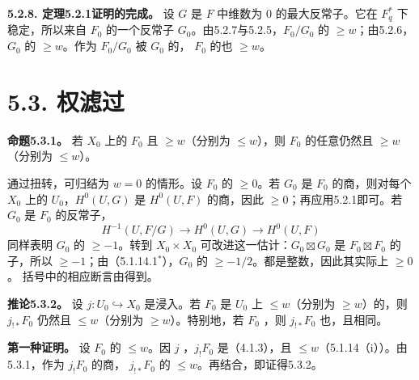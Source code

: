 \par\medskip\noindent\textbf{5.2.8. 定理5.2.1证明的完成。} 设 $G$ 是 $F$ 中维数为 $0$ 的最大反常子。它在 $F_q^*$ 下稳定，所以来自 $F_0$ 的一个反常子 $G_0$。由5.2.7与5.2.5，$F_0/G_0$ 的 $\ge w$；由5.2.6，$G_0$ 的 $\ge w$。作为 $F_0/G_0$ 被 $G_0$ 的， $F_0$ 的也 $\ge w$。

\section*{5.3. 权滤过}
\par\medskip\noindent\textbf{命题5.3.1。} 若 $X_0$ 上的 $F_0$ 且 $\ge w$（分别为 $\le w$），则 $F_0$ 的任意仍然且 $\ge w$（分别为 $\le w$）。

通过扭转，可归结为 $w=0$ 的情形。设 $F_0$ 的 $\ge0$。若 $G_0$ 是 $F_0$ 的商，则对每个 $X_0$ 上的 $U_0$，$H^0(U,G)$ 是 $H^0(U,F)$ 的商，因此 $\ge0$；再应用5.2.1即可。若 $G_0$ 是 $F_0$ 的反常子，
\[
H^{-1}(U,F/G)\longrightarrow H^0(U,G)\longrightarrow H^0(U,F)
\]
同样表明 $G_0$ 的 $\ge-1$。转到 $X_0\times X_0$ 可改进这一估计：$G_0\boxtimes G_0$ 是 $F_0\boxtimes F_0$ 的子，所以 $\ge-1$；由（5.1.14.1${}^*$），$G_0$ 的 $\ge-1/2$。都是整数，因此其实际上 $\ge0$。
括号中的相应断言由得到。

\par\medskip\noindent\textbf{推论5.3.2。} 设 $j:U_0\hookrightarrow X_0$ 是浸入。若 $F_0$ 是 $U_0$ 上 $\le w$（分别为 $\ge w$）的，则 $j_{!*}F_0$ 仍然且 $\le w$（分别为 $\ge w$）。特别地，若 $F_0$ ，则 $j_{!*}F_0$ 也，且相同。

\par\noindent\textbf{第一种证明。} 设 $F_0$ 的 $\le w$。因 $j$ ，$j_!F_0$ 是（4.1.3），且 $\le w$（5.1.14（i））。由5.3.1，作为 $j_!F_0$ 的商， $j_{!*}F_0$ 的 $\le w$。再结合，即证得5.3.2。

